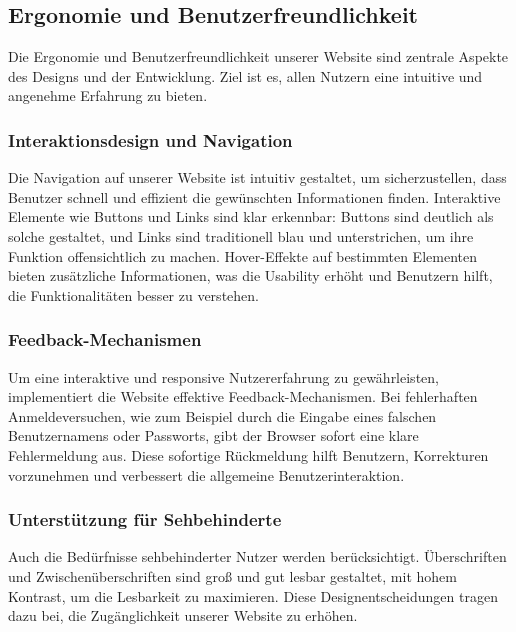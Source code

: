 

\subsection{Ergonomie und Benutzerfreundlichkeit}

Die Ergonomie und Benutzerfreundlichkeit unserer Website sind zentrale Aspekte des Designs und der Entwicklung. Ziel ist es, allen Nutzern eine intuitive und angenehme Erfahrung zu bieten.

\subsubsection{Interaktionsdesign und Navigation}
Die Navigation auf unserer Website ist intuitiv gestaltet, um sicherzustellen, dass Benutzer schnell und effizient die gewünschten Informationen finden. Interaktive Elemente wie Buttons und Links sind klar erkennbar: Buttons sind deutlich als solche gestaltet, und Links sind traditionell blau und unterstrichen, um ihre Funktion offensichtlich zu machen. Hover-Effekte auf bestimmten Elementen bieten zusätzliche Informationen, was die Usability erhöht und Benutzern hilft, die Funktionalitäten besser zu verstehen.

\subsubsection{Feedback-Mechanismen}
Um eine interaktive und responsive Nutzererfahrung zu gewährleisten, implementiert die Website effektive Feedback-Mechanismen. Bei fehlerhaften Anmeldeversuchen, wie zum Beispiel durch die Eingabe eines falschen Benutzernamens oder Passworts, gibt der Browser sofort eine klare Fehlermeldung aus. Diese sofortige Rückmeldung hilft Benutzern, Korrekturen vorzunehmen und verbessert die allgemeine Benutzerinteraktion.

\subsubsection{Unterstützung für Sehbehinderte}
Auch die Bedürfnisse sehbehinderter Nutzer werden berücksichtigt. Überschriften und Zwischenüberschriften sind groß und gut lesbar gestaltet, mit hohem Kontrast, um die Lesbarkeit zu maximieren. Diese Designentscheidungen tragen dazu bei, die Zugänglichkeit unserer Website zu erhöhen.

